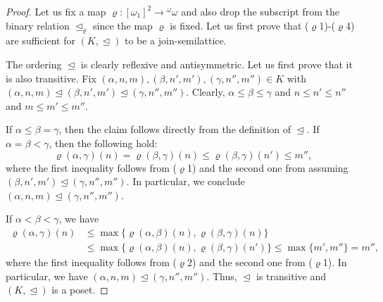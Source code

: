 \documentclass[]{amsart}
\theoremstyle{definition}
\theoremstyle{remark}
\begin{document}
\begin{proof}
Let us fix a map $\varrho:[\omega_1]^2 \rightarrow {}^\omega \omega$ and also drop the subscript from the binary relation $\trianglelefteq_\varrho$ since the map $\varrho$ is fixed. Let us first prove that ($\varrho$1)-($\varrho$4) are sufficient for $(K, \trianglelefteq)$ to be a join-semilattice.

The ordering $\trianglelefteq$ is clearly reflexive and antisymmetric. Let us first prove that it is also transitive. Fix $(\alpha, n, m), (\beta, n', m'), (\gamma, n'',m'') \in K$ with $(\alpha, n, m) \trianglelefteq (\beta, n', m') \trianglelefteq (\gamma, n'',m'')$. Clearly, $\alpha \le \beta \le \gamma$ and $n \le n' \le n''$ and $m \le m' \le m''$. 

If $\alpha \le \beta = \gamma$, then the claim follows directly from the definition of $\trianglelefteq$. If $\alpha = \beta < \gamma$, then the following hold:
\[
\varrho(\alpha, \gamma)(n) = \varrho(\beta, \gamma)(n) \le \varrho(\beta, \gamma)(n') \le m'',
\]
where the first inequality follows from ($\varrho$1) and the second one from assuming $(\beta, n', m') \trianglelefteq (\gamma, n'',m'')$. In particular, we conclude $(\alpha, n, m) \trianglelefteq (\gamma, n'', m'')$.

If $\alpha  < \beta < \gamma$, we have
\begin{align*}
\varrho(\alpha, \gamma)(n) &\le \max \{\varrho(\alpha, \beta)(n) , \varrho(\beta, \gamma)(n)\}\\
&\le \max \{\varrho(\alpha, \beta)(n), \varrho(\beta, \gamma)(n')\} \le \max\{m', m''\} = m'',
\end{align*}
where the first inequality follows from ($\varrho$2) and the second one from ($\varrho$1). In particular, we have $(\alpha, n, m) \trianglelefteq (\gamma, n'', m'')$.  Thus, $\trianglelefteq$ is transitive and $(K, \trianglelefteq)$ is a poset.


\end{proof}
\end{document}
